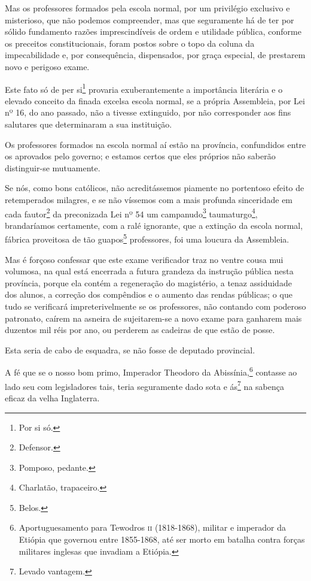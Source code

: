Mas os professores formados pela escola normal, por um privilégio
exclusivo e misterioso, que não podemos compreender, mas que seguramente
há de ter por sólido fundamento razões imprescindíveis de ordem e
utilidade pública, conforme os preceitos constitucionais, foram postos
sobre o topo da coluna da impecabilidade e, por consequência,
dispensados, por graça especial, de prestarem novo e perigoso exame.

Este fato só de per si\footnote{Por si só.} provaria exuberantemente a
importância literária e o elevado conceito da finada excelsa escola
normal, se a própria Assembleia, por Lei nº 16, do ano passado, não a
tivesse extinguido, por não corresponder aos fins salutares que
determinaram a sua instituição.

Os professores formados na escola normal aí estão na província,
confundidos entre os aprovados pelo governo; e estamos certos que eles
próprios não saberão distinguir-se mutuamente.

Se nós, como bons católicos, não acreditássemos piamente no portentoso
efeito de retemperados milagres, e se não víssemos com a mais profunda
sinceridade em cada fautor\footnote{Defensor.} da preconizada Lei nº
54 um campanudo\footnote{Pomposo, pedante.} taumaturgo\footnote{
  Charlatão, trapaceiro.}, brandaríamos certamente, com a ralé
ignorante, que a extinção da escola normal, fábrica proveitosa de tão
guapos\footnote{Belos.} professores, foi uma loucura da Assembleia.

Mas é forçoso confessar que este exame verificador traz no ventre cousa
mui volumosa, na qual está encerrada a futura grandeza da instrução
pública nesta província, porque ela contém a regeneração do magistério,
a tenaz assiduidade dos alunos, a correção dos compêndios e o aumento
das rendas públicas; o que tudo se verificará impreterivelmente se os
professores, não contando com poderoso patronato, caírem na asneira de
sujeitarem-se a novo exame para ganharem mais duzentos mil réis por ano,
ou perderem as cadeiras de que estão de posse.

Esta seria de cabo de esquadra, se não fosse de deputado provincial.

A fé que se o nosso bom primo, Imperador Theodoro da
Abissínia,\footnote{Aportuguesamento para Tewodros \textsc{ii} (1818-1868),
  militar e imperador da Etiópia que governou entre 1855-1868, até ser
  morto em batalha contra forças militares inglesas que invadiam a
  Etiópia.} contasse ao lado seu com legisladores tais, teria
seguramente dado sota e ás\footnote{Levado vantagem.} na sabença
eficaz da velha Inglaterra.

